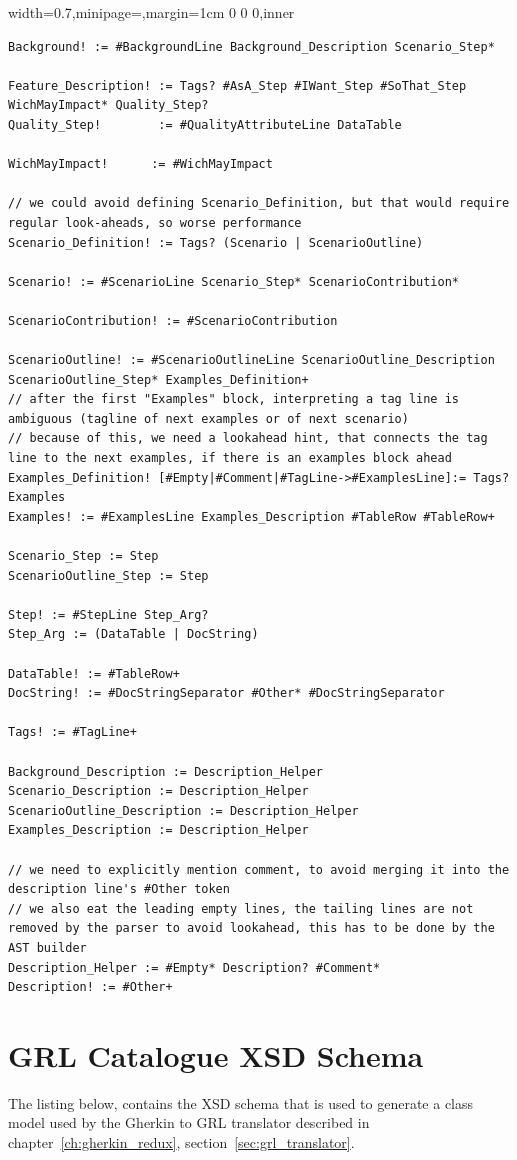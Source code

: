 \documentclass[dissertation,final]{softeng}
\newenvironment{featurecode}[1]
{ \lrbox\featurebox \begin{adjustbox}{width=#1\textwidth,minipage=\textwidth,margin=1cm 0 0 0,inner} }
{ \end{adjustbox}\endlrbox}
\newenvironment{featurelist}[2]
{
\newcommand{\setcaption}{\caption{#1}}
\newcommand{\setlabel}{\label{#2}}
}
{\begin{listing}[h!]\centering\usebox\featurebox\setcaption\setlabel\end{listing}}
\begin{document}
\begin{appendices}
\begin{featurelist}{Updated gherkin grammar}{lst:updated_gherkin_grammar}
\begin{featurecode}{0.7}
\begin{verbatim}
Background! := #BackgroundLine Background_Description Scenario_Step*

Feature_Description! := Tags? #AsA_Step #IWant_Step #SoThat_Step WichMayImpact* Quality_Step?
Quality_Step!        := #QualityAttributeLine DataTable

WichMayImpact!		:= #WichMayImpact

// we could avoid defining Scenario_Definition, but that would require regular look-aheads, so worse performance
Scenario_Definition! := Tags? (Scenario | ScenarioOutline)

Scenario! := #ScenarioLine Scenario_Step* ScenarioContribution*

ScenarioContribution! := #ScenarioContribution

ScenarioOutline! := #ScenarioOutlineLine ScenarioOutline_Description ScenarioOutline_Step* Examples_Definition+
// after the first "Examples" block, interpreting a tag line is ambiguous (tagline of next examples or of next scenario)
// because of this, we need a lookahead hint, that connects the tag line to the next examples, if there is an examples block ahead
Examples_Definition! [#Empty|#Comment|#TagLine->#ExamplesLine]:= Tags? Examples
Examples! := #ExamplesLine Examples_Description #TableRow #TableRow+

Scenario_Step := Step
ScenarioOutline_Step := Step

Step! := #StepLine Step_Arg?
Step_Arg := (DataTable | DocString)

DataTable! := #TableRow+
DocString! := #DocStringSeparator #Other* #DocStringSeparator

Tags! := #TagLine+

Background_Description := Description_Helper
Scenario_Description := Description_Helper
ScenarioOutline_Description := Description_Helper
Examples_Description := Description_Helper

// we need to explicitly mention comment, to avoid merging it into the description line's #Other token
// we also eat the leading empty lines, the tailing lines are not removed by the parser to avoid lookahead, this has to be done by the AST builder
Description_Helper := #Empty* Description? #Comment*
Description! := #Other+
\end{verbatim}
\end{featurecode}
\end{featurelist}

\chapter{GRL Catalogue XSD Schema}
\label{ch:grl_catalogue_schema}
The listing below, contains the XSD schema that is used to generate a class model used by the Gherkin to GRL translator described in chapter~\ref{ch:gherkin_redux}, section~\ref{sec:grl_translator}.


\end{appendices}
\end{document}
